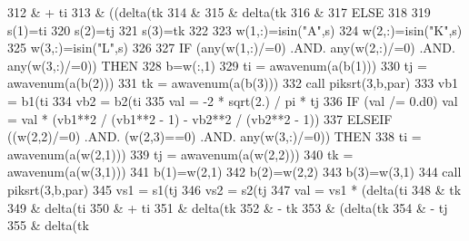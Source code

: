 \begin{DoxyCode}
312                      & + ti%
313                      & ((delta(tk%
314                      &%
315                      & delta(tk%
316                      &%
317              \textcolor{keywordflow}{ELSE}
318 
319                 s(1)=ti%
320                 s(2)=tj%
321                 s(3)=tk%
322 
323                 w(1,:)=isin(\textcolor{stringliteral}{"A"},s)
324                 w(2,:)=isin(\textcolor{stringliteral}{"K"},s)
325                 w(3,:)=isin(\textcolor{stringliteral}{"L"},s)
326 
327                 \textcolor{keywordflow}{IF} (any(w(1,:)/=0) .AND. any(w(2,:)/=0) .AND. any(w(3,:)/=0)) \textcolor{keywordflow}{THEN}
328                    b=w(:,1)
329                    ti = awavenum(a(b(1)))
330                    tj = awavenum(a(b(2)))
331                    tk = awavenum(a(b(3)))
332                    \textcolor{keyword}{call }piksrt(3,b,par)
333                    vb1 = b1(ti%
334                    vb2 = b2(ti%
335                    val = -2 * sqrt(2.) / pi * tj%
336                    \textcolor{keywordflow}{IF} (val /= 0.d0) val = val * (vb1**2 / (vb1**2 - 1) - vb2**2 / (vb2**2 - 1))
337                 \textcolor{keywordflow}{ELSEIF} ((w(2,2)/=0) .AND. (w(2,3)==0) .AND. any(w(3,:)/=0)) \textcolor{keywordflow}{THEN}
338                    ti = awavenum(a(w(2,1)))
339                    tj = awavenum(a(w(2,2)))
340                    tk = awavenum(a(w(3,1)))
341                    b(1)=w(2,1)
342                    b(2)=w(2,2)
343                    b(3)=w(3,1)
344                    \textcolor{keyword}{call }piksrt(3,b,par)
345                    vs1 = s1(tj%
346                    vs2 = s2(tj%
347                    val = vs1 * (delta(ti%
348                         & tk%
349                         & delta(ti%
350                         & + ti%
351                         & delta(tk%
352                         & - tk%
353                         & (delta(tk%
354                         & - tj%
355                         & delta(tk%

\end{DoxyCode}

